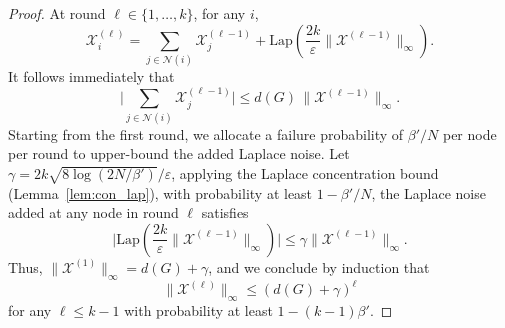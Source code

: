 \begin{proof}
At round $\ell \in \{1, \dots, k\}$, for any $i$,
\begin{equation}
\label{e:strawman_noisy_count}
    \mathcal{X}^{(\ell)}_i = \sum_{j \in \mathcal{N}(i)} \mathcal{X}^{(\ell-1)}_j + \mathrm{Lap}(\frac{2k}{\varepsilon}\|\mathcal{X}^{(\ell-1)}\|_\infty).
\end{equation}
It follows immediately that 
\begin{equation*}
    \bigg|\sum_{j \in \mathcal{N}(i)} \mathcal{X}^{(\ell-1)}_j \bigg| 
    \leq d(G)\, \|\mathcal{X}^{(\ell-1)}\|_\infty. 
\end{equation*}
Starting from the first round, we allocate a failure probability of $\beta'/N$ per node per round to upper-bound the added Laplace noise. 
Let 
$\gamma = 2k\sqrt{8\log(2N/\beta')}/\varepsilon$, applying the Laplace concentration bound (Lemma~\ref{lem:con_lap}), with probability at least $1- \beta'/N$, the Laplace noise added at any node in round $\ell$ satisfies
\begin{equation*}
   \bigg| \mathrm{Lap}(\frac{2k}{\varepsilon}\|\mathcal{X}^{(\ell-1)}\|_\infty) \bigg|
   \leq \gamma  \|\mathcal{X}^{(\ell-1)}\|_\infty.
\end{equation*}
Thus, $\|\mathcal{X}^{(1)}\|_\infty = d(G)+\gamma$, and we conclude by induction that
\begin{equation}
\label{e:round_max_wk}
    \|\mathcal{X}^{(\ell)}\|_\infty \leq (d(G) + \gamma)^{\ell}
\end{equation}
for any $\ell \leq k-1$ with probability at least $1 - (k-1)\beta'$.



\end{proof}
